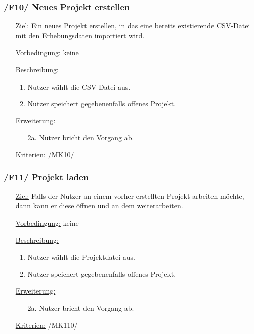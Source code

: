 \documentclass{article}
\begin{document}
\subsubsection*{\textbf{/F10/} Neues Projekt erstellen} \label{sec:f:Neues Projekt erstellen}
\begin{itemize}
    \item[\underline{Ziel:}] Ein neues Projekt erstellen, in das eine bereits existierende CSV-Datei mit den Erhebungsdaten importiert wird.
    \item[\underline{Vorbedingung:}] keine
    \item[\underline{Beschreibung:}]
    \begin{enumerate}
        \item Nutzer wählt die CSV-Datei aus.
        \item Nutzer speichert gegebenenfalls offenes Projekt.
    \end{enumerate}
    \item[\underline{Erweiterung:}]
    \begin{itemize}
        \item[2a.] Nutzer bricht den Vorgang ab.
    \end{itemize}
    \item[\underline{Kriterien:}] /MK10/
\end{itemize}

\subsubsection*{\textbf{/F11/} Projekt laden} \label{sec:f:Projekt laden}
\begin{itemize}
    \item[\underline{Ziel:}] Falls der Nutzer an einem vorher erstellten Projekt arbeiten möchte, dann kann er diese öffnen und an dem weiterarbeiten.
    \item[\underline{Vorbedingung:}] keine
    \item[\underline{Beschreibung:}]
    \begin{enumerate}
        \item Nutzer wählt die Projektdatei aus.
        \item Nutzer speichert gegebenenfalls offenes Projekt.
    \end{enumerate}
    \item[\underline{Erweiterung:}]
    \begin{itemize}
        \item[2a.] Nutzer bricht den Vorgang ab.
    \end{itemize}
    \item[\underline{Kriterien:}] /MK110/
\end{itemize}
\end{document}
